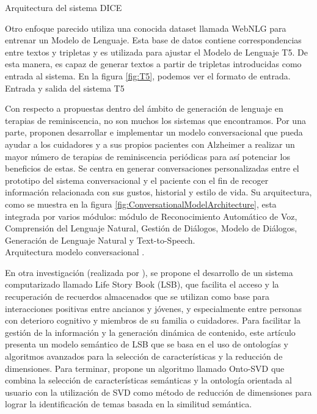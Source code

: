 %
{Arquitectura del sistema DICE}

Otro enfoque parecido utiliza una conocida dataset llamada WebNLG para entrenar un Modelo de Lenguaje. Esta base de datos contiene correspondencias entre textos y tripletas y es utilizada para ajustar el Modelo de Lenguaje T5. De esta manera, es capaz de generar textos a partir de tripletas introducidas como entrada al sistema. En la figura \ref{fig:T5}, podemos ver el formato de entrada.\\

%
{Entrada y salida del sistema T5}

Con respecto a propuestas dentro del ámbito de generación de lenguaje en terapias de reminiscencia, no son muchos los sistemas que encontramos. Por una parte, \citep{deconversational} proponen desarrollar e implementar un modelo conversacional que pueda ayudar a los cuidadores y a sus propios pacientes con Alzheimer a realizar un mayor número de terapias de reminiscencia periódicas para así potenciar los beneficios de estas. Se centra en generar conversaciones personalizadas entre el prototipo del sistema conversacional y el paciente con el fin de recoger información relacionada con sus gustos, historial y estilo de vida. Su arquitectura, como se muestra en la figura \ref{fig:ConversationalModelArchitecture}, esta integrada por varios módulos: módulo de Reconocimiento Automático de Voz, Comprensión del Lenguaje Natural, Gestión de Diálogos, Modelo de Diálogos, Generación de Lenguaje Natural y Text-to-Speech.\\


%
{Arquitectura modelo conversacional \citep{deconversational}.}

En otra investigación (realizada por \cite{shi2012user}), se propone el desarrollo de un sistema computarizado llamado Life Story Book (LSB), que facilita el acceso y la recuperación de recuerdos almacenados que se utilizan como base para interacciones positivas entre ancianos y jóvenes, y especialmente entre personas con deterioro cognitivo y miembros de su familia o cuidadores. Para facilitar la gestión de la información y la generación dinámica de contenido, este artículo presenta un modelo semántico de LSB que se basa en el uso de ontologías y algoritmos avanzados para la selección de características y la reducción de dimensiones. Para terminar, propone un algoritmo llamado Onto-SVD que combina la selección de características semánticas y la ontología orientada al usuario con  la utilización de SVD como método de reducción de dimensiones para lograr la identificación de temas basada en la similitud semántica.\\

